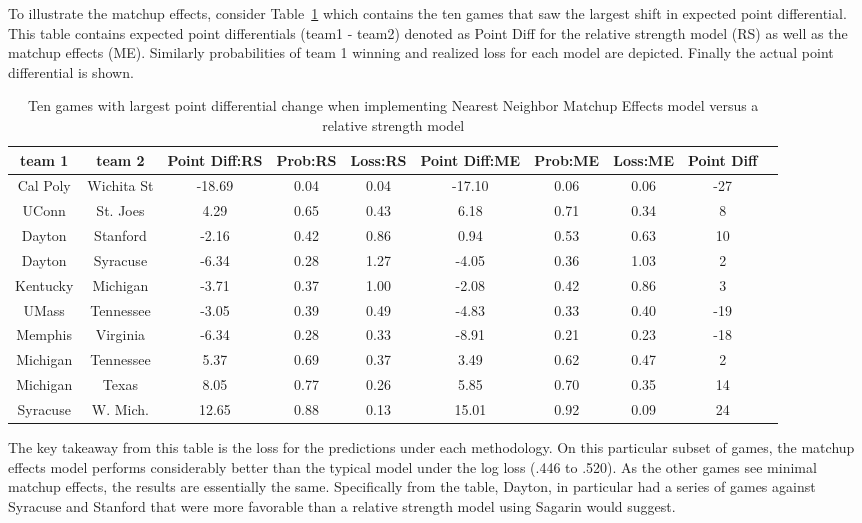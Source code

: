 To illustrate the matchup effects, consider Table~\ref{tab:change} which contains the ten games that saw the largest shift in expected point differential. This table contains expected point differentials (team1 - team2) denoted as Point Diff for the relative strength model (RS) as well as the matchup effects (ME).  Similarly probabilities of team 1 winning and realized loss for each model are depicted.  Finally the actual point differential is shown.
\begin{table}[h!]
\caption{ Ten games with largest point differential change when implementing Nearest Neighbor Matchup Effects model versus a relative strength model}
\scriptsize
\centering
\begin{tabular}{|cc | ccc | ccc | c|c|}
  \hline
  \hline
 team 1 & team 2 & Point Diff:RS & Prob:RS & Loss:RS & Point Diff:ME & Prob:ME & Loss:ME & Point Diff\\ 
  \hline
 Cal Poly & Wichita St & -18.69 & 0.04 & 0.04 & -17.10 & 0.06 & 0.06 &  -27\\ 
 UConn & St. Joes &4.29 & 0.65 & 0.43 & 6.18 & 0.71 & 0.34 & 8\\ 
 Dayton & Stanford & -2.16 & 0.42 & 0.86 & 0.94 & 0.53 & 0.63 & 10 \\ 
 Dayton & Syracuse & -6.34 & 0.28 & 1.27 & -4.05 & 0.36 & 1.03 & 2\\ 
 Kentucky & Michigan & -3.71 & 0.37 & 1.00 & -2.08 & 0.42 & 0.86 &  3\\ 
 UMass & Tennessee &-3.05 & 0.39 & 0.49 & -4.83 & 0.33 & 0.40 & -19\\ 
 Memphis & Virginia & -6.34 & 0.28 & 0.33 & -8.91 & 0.21 & 0.23 & -18\\ 
 Michigan & Tennessee & 5.37 & 0.69 & 0.37 & 3.49 & 0.62 & 0.47 & 2\\ 
 Michigan & Texas & 8.05 & 0.77 & 0.26 & 5.85 & 0.70 & 0.35 & 14\\ 
 Syracuse & W. Mich. & 12.65 & 0.88 & 0.13 & 15.01 & 0.92 & 0.09 & 24\\ 
   \hline
   \hline
\end{tabular}
\label{tab:change}
\end{table}
The key takeaway from this table is the loss for the predictions under each methodology. On this particular subset of games, the matchup effects model performs considerably better than the typical model under the log loss (.446 to .520). As the other games see minimal matchup effects, the results are essentially the same.  Specifically from the table, Dayton, in particular had a series of games against Syracuse and Stanford that were more favorable than a relative strength model using Sagarin would suggest.